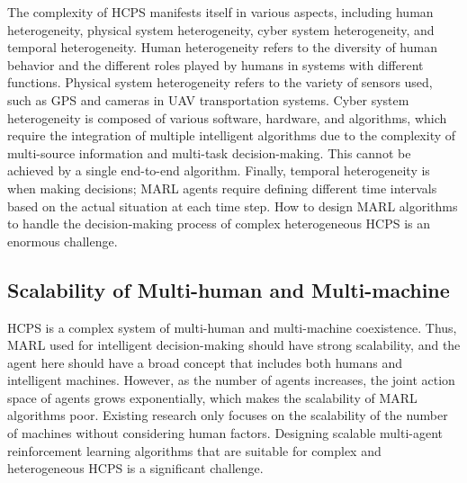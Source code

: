\documentclass[acmsmall]{acmart}
\begin{document}
The complexity of HCPS manifests itself in various aspects, including human heterogeneity, physical system heterogeneity, cyber system heterogeneity, and temporal heterogeneity. Human heterogeneity refers to the diversity of human behavior and the different roles played by humans in systems with different functions. Physical system heterogeneity refers to the variety of sensors used, such as GPS and cameras in UAV transportation systems. Cyber system heterogeneity is composed of various software, hardware, and algorithms, which require the integration of multiple intelligent algorithms due to the complexity of multi-source information and multi-task decision-making. This cannot be achieved by a single end-to-end algorithm. Finally, temporal heterogeneity is when making decisions; MARL agents require defining different time intervals based on the actual situation at each time step. How to design MARL algorithms to handle the decision-making process of complex heterogeneous HCPS is an enormous challenge. 

\subsection{Scalability of Multi-human and Multi-machine}
HCPS is a complex system of multi-human and multi-machine coexistence. Thus, MARL used for intelligent decision-making should have strong scalability, and the agent here should have a broad concept that includes both humans and intelligent machines. However, as the number of agents increases, the joint action space of agents grows exponentially, which makes the scalability of MARL algorithms poor. Existing research only focuses on the scalability of the number of machines without considering human factors. Designing scalable multi-agent reinforcement learning algorithms that are suitable for complex and heterogeneous HCPS is a significant challenge. 
\end{document}
